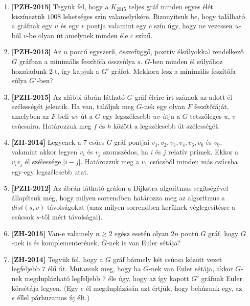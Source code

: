 \documentclass[a4paper, 12pt]{article}
\begin{document}
\begin{enumerate}
        \item \textbf{[PZH-2015]} Tegyük fel, hogy a $K_{2015}$ teljes gráf minden egyes élét kiszíneztük $1008$ lehetséges szín valamelyikére. Bizonyítsuk be, hogy található a gráfnak egy $u$ és egy $v$ pontja valamint egy $c$ szín úgy, hogy ne vezessen $u$-ból $v$-be olyan út amelynek minden éle $c$ színű.
        \item \textbf{[PZH-2013]} Az $n$ pontú egyszerű, összefüggő, pozitív élsúlyokkal rendelkező $G$ gráfban a minimális feszítőfa összsúlya $s$. $G$-ben minden él súlyához hozzáadunk $2$-t, így kapjuk a $G'$ gráfot. Mekkora lesz a minimális feszítőfa súlya $G'$-ben?
        \item \textbf{[PZH-2015]} Az alábbi ábrán látható $G$ gráf éleire írt számok az adott él szélességét jelentik. Ha van, találjuk meg $G$-nek egy olyan $F$ feszítőfáját, amelyben az $F$-beli $uv$ út a $G$ egy legszélesebb $uv$ útja a $G$ tetszőleges $u$, $v$ csúcsaira. Határozzuk meg $f$ és $h$ között a legszélesebb út szélességét.
        \begin{figure}[!ht]
            \centering
            
        \end{figure}
        
        \item \textbf{[ZH-2014]} Legyenek a $7$ csúcs $G$ gráf pontjai $v_1,v_2,v_3,v_4,v_6,v_8$ és $v_9$, valamint akkor legyen $v_i$ és $v_j$ szomszédos, ha $i$ és $j$ relatív prímek. Ekkor a $v_iv_j$ él szélessége $|i-j|$. Határozzuk meg a $v_1$ csúcsból minden más csúcsba egy-egy legszélesebb utat.
        \item \textbf{[PZH-2012]} Az ábrán látható gráfon a Dijkstra algoritmus segítségével állapítsuk meg, hogy milyen sorrendben határozza meg az algoritmus a $dist(s,v)$ távolságokat (azaz milyen sorrendben kerülnek véglegesítésre a csúcsok $s$-től mért távolságai).
        \begin{figure}[!ht]
            \centering
            
        \end{figure}
        \item \textbf{[ZH-2015]} Van-e valamely $n\geq 2$ egész esetén olyan $2n$ pontú $G$ gráf, hogy $G$-nek is és komplementerének, $\bar{G}$-nek is van Euler sétája?
        
        \item \textbf{[ZH-2014]} Tegyük fel, hogy a $G$ gráf bármely két csúcsa között vezet legfeljebb $7$ élű út. Mutassuk meg, hogy ha $G$-nek van Euler sétája, akkor $G$-nek megduplázható legfeljebb $7$ éle úgy, hogy az így kapott $G'$ gráfnak Euler körsétája legyen. (Egy $e$ él megduplázásán azt értjük, hogy behúzunk egy, az $e$ éllel párhuzamos új élt.)
        

\end{enumerate}
\end{document}
